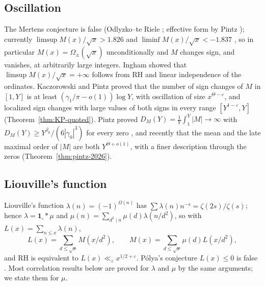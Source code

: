 \documentclass[11pt]{amsart}
\numberwithin{equation}{section}
\theoremstyle{plain}
\theoremstyle{definition}
\theoremstyle{remark}
\newcommand{\eps}{\varepsilon}
\begin{document}
\subsection{Oscillation}
The Mertens conjecture is false (Odlyzko--te Riele \cite{OdlyzkoTeRiele1985};
effective form by Pintz \cite{Pintz1987}); currently
$\limsup M(x)/\sqrt x>1.826$ and $\liminf M(x)/\sqrt x<-1.837$
\cite{Hurst18}, so in particular $M(x)=\Omega_\pm(\sqrt x)$ unconditionally
and $M$ changes sign, and vanishes, at arbitrarily large integers. Ingham
\cite{Ingham1942} showed that $\limsup M(x)/\sqrt x=+\infty$ follows from RH
and linear independence of the ordinates. Kaczorowski and Pintz \cite{KP86}
proved that the number of sign changes of $M$ in $[1,Y]$ is at least
$(\gamma_1/\pi-o(1))\log Y$, with oscillation of size $x^{\Theta-\eps}$, and
localized sign changes with large values of both signs in every range $[Y^{1-\eps},Y]$
(Theorem~\ref{thm:KP-quoted}). Pintz proved $D_M(Y)=\frac1Y\int_1^Y|M|\to\infty$
with $D_M(Y)\ge Y^{\beta_0}/(6|\gamma_0|^3)$ for every zero
\cite{Pintz1983}, and recently that the mean and the late maximal order of
$|M|$ are both $Y^{\Theta+o(1)}$, with a finer description through the
zeros \cite{Pintz2026} (Theorem~\ref{thm:pintz-2026}).

\subsection{Liouville's function}
Liouville's function $\lambda(n)=(-1)^{\Omega(n)}$ has
$\sum\lambda(n)n^{-s}=\zeta(2s)/\zeta(s)$; hence $\lambda=\mathbf 1_{\square}*\mu$
and $\mu(n)=\sum_{d^2\mid n}\mu(d)\lambda(n/d^2)$, so with
$L(x)=\sum_{n\le x}\lambda(n)$,
\[
L(x)=\sum_{d\le\sqrt x}M(x/d^2),\qquad M(x)=\sum_{d\le\sqrt x}\mu(d)L(x/d^2),
\]
and RH is equivalent to $L(x)\ll_\eps x^{1/2+\eps}$. Pólya's conjecture
$L(x)\le0$ is false \cite{Haselgrove1958}. Most correlation results below are
proved for $\lambda$ and $\mu$ by the same arguments; we state them for $\mu$.
\end{document}

